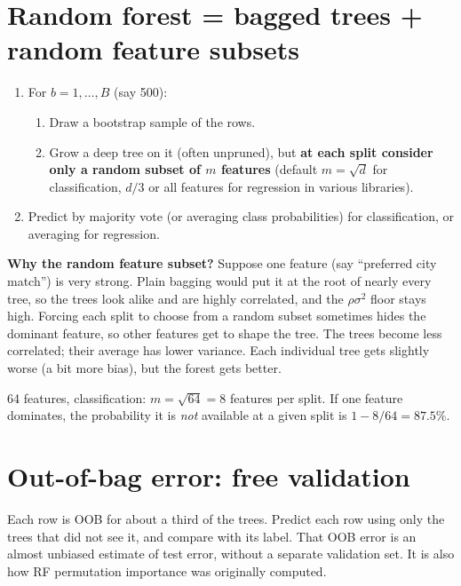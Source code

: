 \section{Random forest = bagged trees + random feature subsets}
\begin{enumerate}
\item For $b = 1,\dots,B$ (say 500):
  \begin{enumerate}
  \item Draw a bootstrap sample of the rows.
  \item Grow a deep tree on it (often unpruned), but \textbf{at each split consider only a random subset of $m$ features}
    (default $m = \sqrt d$ for classification, $d/3$ or all features for regression in various libraries).
  \end{enumerate}
\item Predict by majority vote (or averaging class probabilities) for classification, or averaging for regression.
\end{enumerate}

\textbf{Why the random feature subset?} Suppose one feature (say ``preferred city match'') is very strong. Plain bagging would put it
at the root of nearly every tree, so the trees look alike and are highly correlated, and the $\rho\sigma^2$ floor stays high. Forcing
each split to choose from a random subset sometimes hides the dominant feature, so other features get to shape the tree. The trees
become less correlated; their average has lower variance. Each individual tree gets slightly worse (a bit more bias), but the
forest gets better.

\begin{example}
64 features, classification: $m = \sqrt{64} = 8$ features per split. If one feature dominates, the probability it is
\emph{not} available at a given split is $1 - 8/64 = 87.5\%$.
\end{example}

\section{Out-of-bag error: free validation}
Each row is OOB for about a third of the trees. Predict each row using only the trees that did not see it, and compare with its
label. That OOB error is an almost unbiased estimate of test error, without a separate validation set. It is also how RF
permutation importance was originally computed.

